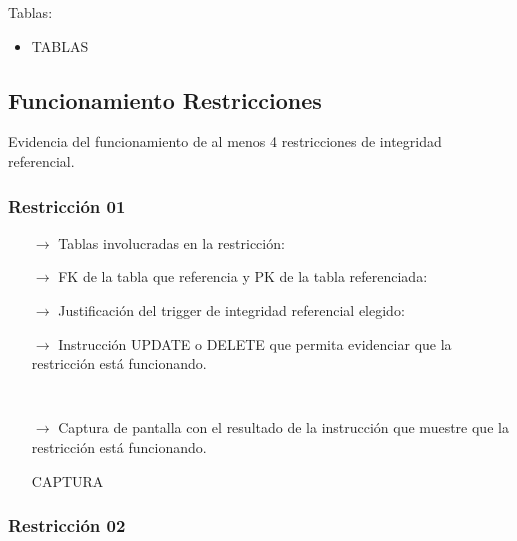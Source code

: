 Tablas:
\begin{itemize}
  \item TABLAS
\end{itemize}

\subsection{Funcionamiento Restricciones}

Evidencia del funcionamiento de al menos 4 restricciones de integridad referencial.

\subsubsection*{Restricción 01}

\begin{itemize}
    \item[$\rightarrow$] Tablas involucradas en la restricción: 
    \item[$\rightarrow$] FK de la tabla que referencia y PK de la tabla referenciada: 
    \item[$\rightarrow$] Justificación del trigger de integridad referencial elegido: 
    \item[$\rightarrow$] Instrucción UPDATE o DELETE que permita evidenciar que la restricción está funcionando.
        \begin{verbatim}
    
        \end{verbatim}

    \item[$\rightarrow$] Captura de pantalla con el resultado de la instrucción que muestre que la restricción está funcionando.
    
        \begin{center}
            CAPTURA
        \end{center}

\end{itemize}

\subsubsection*{Restricción 02}

